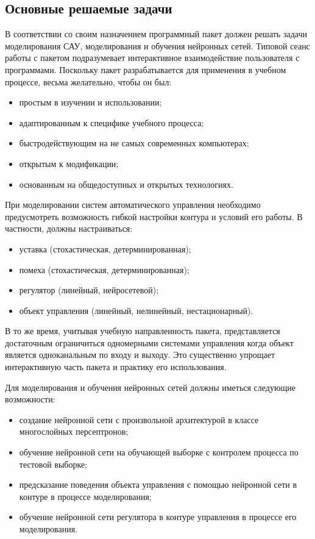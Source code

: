 
\subsection{Основные решаемые задачи}

В соответствии со своим назначением программный пакет должен решать
задачи моделирования САУ, моделирования и обучения нейронных сетей.
Типовой сеанс работы с пакетом подразумевает интерактивное
взаимодействие пользователя с программами.  Поскольку пакет
разрабатывается для применения в учебном процессе, весьма желательно,
чтобы он был:
\begin{itemize}
\item простым в изучении и использовании;
\item адаптированным к специфике учебного процесса;
\item быстродействующим на не самых современных компьютерах;
\item открытым к модификации;
\item основанным на общедоступных и открытых технологиях.
\end{itemize}

При моделировании систем автоматического управления необходимо
предусмотреть возможность гибкой настройки контура и условий его
работы.  В частности, должны настраиваться:
\begin{itemize}
\item уставка (стохастическая, детерминированная);
\item помеха (стохастическая, детерминированная);
\item регулятор (линейный, нейросетевой);
\item объект управления (линейный, нелинейный, нестационарный).
\end{itemize}


В то же время, учитывая учебную направленность пакета, представляется
достаточным ограничиться одномерными системами управления когда объект
является одноканальным по входу и выходу.  Это существенно упрощает
интерактивную часть пакета и практику его использования.

Для моделирования и обучения нейронных сетей должны иметься следующие
возможности:
\begin{itemize}
\item создание нейронной сети с произвольной архитектурой в классе
  многослойных персептронов;
\item обучение нейронной сети на обучающей выборке с контролем
  процесса по тестовой выборке;
\item предсказание поведения объекта управления с помощью нейронной
  сети в контуре в процессе моделирования;
\item обучение нейронной сети регулятора в контуре управления в
  процессе его моделирования.
\end{itemize}

